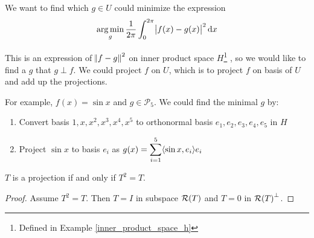 \begin{example}
    We want to find which $g \in U$ could minimize the expression
    \begin{equation}
        \argmin{g} \frac{1}{2\pi}\int_{0}^{2\pi} \absolutevalue{f(x) - g(x)}^2 \dif x
    \end{equation}
    
     This is an expression of $\norm{f - g}^2$ on inner product space $H$\footnote{Defined in Example \ref{inner_product_space_h}} , so we would like to find a $g$ that $g \perp f$. We could project $f$ on $U$, which is to project $f$ on basis of $U$ and add up the projections.
     
     For example, $f(x) = \sin{x}$ and $g \in \mathcal{P}_5$. We could find the minimal $g$ by:
     \begin{enumerate}
         \item Convert basis $1, x, x^2, x^3, x^4, x^5$ to orthonormal basis $e_1, e_2, e_3, e_4, e_5$ in $H$
         \item Project $\sin{x}$ to basis $e_i$ as $\displaystyle g(x) = \sum_{i=1}^5 \innerproduct{\sin{x}}{e_i}e_i$
     \end{enumerate}
\end{example}



\begin{theorem}
    $T$ is a projection if and only if $T^2 = T$.    
\end{theorem}
\begin{proof}
    Assume $T^2 = T$. Then $T=I$ in subspace $\rangespace{T}$ and $T = 0$ in $\rangespace{T}^\perp$.
\end{proof}

